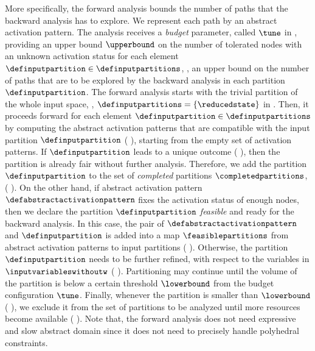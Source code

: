 {
More specifically, the forward analysis bounds the number of paths that the backward analysis has to explore.
We represent each path by an abstract activation pattern.
The analysis receives a \emph{budget} parameter, called $\tune$ in , providing an upper bound $\upperbound$ on the number of tolerated \relu{} nodes with an unknown activation status for each element $\definputpartition\in\definputpartitions$, \ie, an upper bound on the number of paths that are to be explored by the backward analysis in each partition $\definputpartition$.
The forward analysis starts with the trivial partition of the whole input space, \ie, $\definputpartitions = \{\reducedstate\}$ in .
Then, it proceeds forward for each element $\definputpartition\in\definputpartitions$ by computing the abstract activation patterns that are compatible with the input partition $\definputpartition$ (\cf{} ), starting from the empty set of activation patterns. If $\definputpartition$ leads to a unique outcome (\cf{} ), then the partition is already fair without further analysis.
Therefore, we add the partition $\definputpartition$ to the set of \emph{completed} partitions $\completedpartitions$, (\cf{} ).
On the other hand, if abstract activation pattern $\defabstractactivationpattern$ fixes the activation status of enough \relu{} nodes, then we declare the partition $\definputpartition$ \emph{feasible} and ready for the backward analysis.
In this case, the pair of $\defabstractactivationpattern$ and $\definputpartition$ is added into a map $\feasiblepartitions$ from abstract activation patterns to input partitions (\cf{} ).
Otherwise, the partition $\definputpartition$ needs to be further refined, with respect to the variables in $\inputvariableswithoutw$ (\cf{} ).
Partitioning may continue until the volume of the partition is below a certain threshold $\lowerbound$ from the budget configuration $\tune$.
Finally, whenever the partition is smaller than $\lowerbound$ (\cf{} ), we exclude it from the set of partitions to be analyzed until more resources become available (\cf{} ).
Note that, the forward analysis does not need expressive and slow abstract domain since it does not need to precisely handle polyhedral constraints.

}
